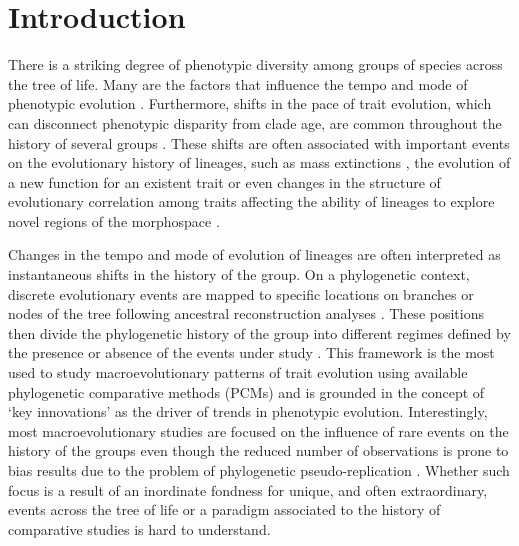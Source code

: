 \section{Introduction}

There is a striking degree of phenotypic diversity among groups of species across the tree of life. Many are the factors that influence the tempo and mode of phenotypic evolution \citep[e.g.,][]{adams_are_2009, cooper_what_2009, hipsley_morphological_2014}. Furthermore, shifts in the pace of trait evolution, which can disconnect phenotypic disparity from clade age, are common throughout the history of several groups \citep{Eastman_2011, benson_rates_2013, mahler_exceptional_2013, Rabosky_2013, slater_phylogenetic_2013, rabosky_analysis_2014, Uyeda_BayOU}. These shifts are often associated with important events on the evolutionary history of lineages, such as mass extinctions \citep{slater_phylogenetic_2013}, the evolution of a new function for an existent trait \citep{benson_rates_2013, dececchi_body_2013} or even changes in the structure of evolutionary correlation among traits affecting the ability of lineages to explore novel regions of the morphospace \citep{revell_phylogenetic_2009, caetano_sysbio_2017}.

Changes in the tempo and mode of evolution of lineages are often interpreted as instantaneous shifts in the history of the group. On a phylogenetic context, discrete evolutionary events are mapped to specific locations on branches or nodes of the tree following ancestral reconstruction analyses \citep{schluter_likelihood_1997, pagel_maximum_1999, huelsenbeck_stochastic_2003}. These positions then divide the phylogenetic history of the group into different regimes defined by the presence or absence of the events under study \citep{butler_phylogenetic_2004, omeara_testing_2006, revell_phylogenetic_2009, Eastman_2011, caetano_sysbio_2017}. This framework is the most used to study macroevolutionary patterns of trait evolution using available phylogenetic comparative methods (PCMs) and is grounded in the concept of `key innovations' \citep{simpson_1953, heard_key_1995} as the driver of trends in phenotypic evolution. Interestingly, most macroevolutionary studies are focused on the influence of rare events on the history of the groups even though the reduced number of observations is prone to bias results due to the problem of phylogenetic pseudo-replication \citep{maddison_unsolved_2015}. Whether such focus is a result of an inordinate fondness for unique, and often extraordinary, events across the tree of life or a paradigm associated to the history of comparative studies is hard to understand.

